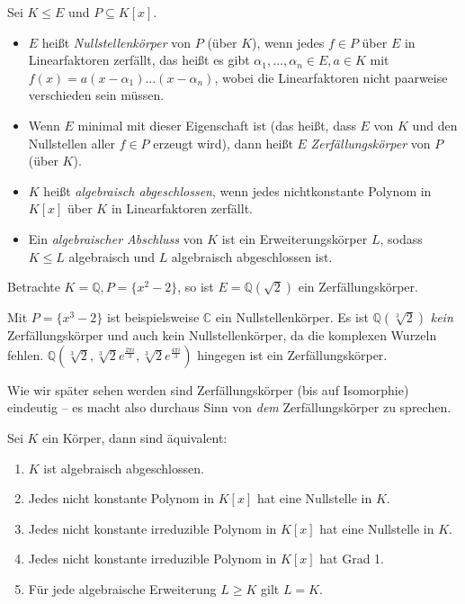 \begin{definition}
    Sei $K \leq E$ und $P \subseteq K[x]$.
    \begin{itemize}
        \item $E$ heißt \emph{Nullstellenkörper} von $P$ (über $K$), wenn jedes $f \in P$ über $E$ in Linearfaktoren zerfällt, das heißt es gibt $\alpha_1, \hdots, \alpha_n \in E, a \in K$ mit $f(x) = a(x - \alpha_1) \hdots (x - \alpha_n)$, wobei die Linearfaktoren nicht paarweise verschieden sein müssen.
        \item Wenn $E$ minimal mit dieser Eigenschaft ist (das heißt, dass $E$ von $K$ und den Nullstellen aller $f \in P$ erzeugt wird), dann heißt $E$ \emph{Zerfällungskörper} von $P$ (über $K$).
        \item $K$ heißt \emph{algebraisch abgeschlossen}, wenn jedes nichtkonstante Polynom in $K[x]$ über $K$ in Linearfaktoren zerfällt.
        \item Ein \emph{algebraischer Abschluss} von $K$ ist ein Erweiterungskörper $L$, sodass $K \leq L$ algebraisch und $L$ algebraisch abgeschlossen ist.
    \end{itemize}
\end{definition}

\begin{example}
    Betrachte $K = \mathbb{Q}, P = \{ x^2 - 2 \}$, so ist $E = \mathbb{Q}(\sqrt{2})$ ein Zerfällungskörper.
    
    Mit $P = \{ x^3 - 2 \}$ ist beispielsweise $\mathbb{C}$ ein Nullstellenkörper. Es ist $\mathbb{Q}(\sqrt[3]{2})$ \emph{kein} Zerfällungskörper und auch kein Nullstellenkörper, da die komplexen Wurzeln fehlen. $\mathbb{Q}(\sqrt[3]{2}, \sqrt[3]{2} e^{\frac{2 \pi i}{3}}, \sqrt[3]{2} e^{\frac{4 \pi i}{3}})$ hingegen ist ein Zerfällungskörper.
\end{example}

\begin{remark}
    Wie wir später sehen werden sind Zerfällungskörper (bis auf Isomorphie) eindeutig -- es macht also durchaus Sinn von \emph{dem} Zerfällungskörper zu sprechen.
\end{remark}

\begin{proposition}
    Sei $K$ ein Körper, dann sind äquivalent:
    \begin{enumerate}
        \item $K$ ist algebraisch abgeschlossen.
        \item Jedes nicht konstante Polynom in $K[x]$ hat eine Nullstelle in $K$.
        \item Jedes nicht konstante irreduzible Polynom in $K[x]$ hat eine Nullstelle in $K$.
        \item Jedes nicht konstante irreduzible Polynom in $K[x]$ hat Grad 1.
        \item Für jede algebraische Erweiterung $L \geq K$ gilt $L = K$.
    \end{enumerate}
\end{proposition}

